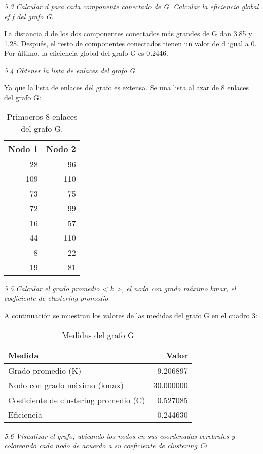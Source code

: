 \documentclass{article}
\begin{document}
\textit{5.3 Calcular d para cada componente conectado de G. Calcular la eﬁciencia global ef f del
grafo G.}

La distancia d de los dos componentes conectados más grandes de G dan 3.85 y 1.28. Después,
el resto de componentes conectados tienen un valor de d igual a 0. Por último, la eficiencia
global del grafo G es 0.2446.

\textit{5.4 Obtener la lista de enlaces del grafo G.}

Ya que la lista de enlaces del grafo es extensa. Se una lista al azar de 8 enlaces del grafo G:

\begin{table}[h]
  \centering
  \caption{Primoeros 8 enlaces del grafo G.}
  \label{tab:enlaces_G}
  \begin{tabular}{rr}
    \toprule
    Nodo 1 & Nodo 2 \\
    \midrule
    28 & 96 \\
    109 & 110 \\
    73 & 75 \\
    72 & 99 \\
    16 & 57 \\
    44 & 110 \\
    8 & 22 \\
    19 & 81 \\
    \bottomrule
    \end{tabular}
\end{table}

\textit{5.5 Calcular el grado promedio < k >, el nodo con grado máximo kmax, el coeﬁciente de 
clustering promedio}

A continuación se muestran los valores de las medidas del grafo G en el cuadro 3:

\begin{table}[h]
  \centering
  \caption{Medidas del grafo G}
  \begin{tabular}{lr}
  \toprule
  Medida & Valor \\
  \midrule
  Grado promedio (K) & 9.206897 \\
  Nodo con grado máximo (kmax) & 30.000000 \\
  Coeficiente de clustering promedio (C) & 0.527085 \\
  Eficiencia & 0.244630 \\
  \bottomrule
  \end{tabular}
  \end{table}

\textit{5.6 Visualizar el grafo, ubicando los nodos en sus coordenadas cerebrales y coloreando cada
nodo de acuerdo a su coeﬁciente de clustering Ci}
\end{document}
